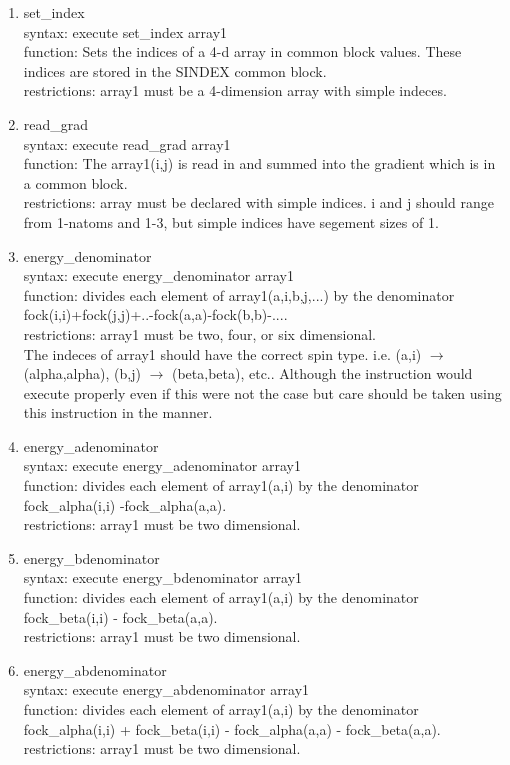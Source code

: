 \documentclass[12pt]{article}
\begin{document}
\begin{enumerate}
\item set\_index\\ 
syntax: execute set\_index array1\\ 
function: Sets the indices of a 4-d array in common block values. These indices are stored 
in the SINDEX common block.\\ 
restrictions: array1 must be a 4-dimension array with simple indeces.

\item read\_grad\\ 
syntax: execute read\_grad array1\\ 
function: The array1(i,j) is read in and summed into the gradient which is in a common block.\\ 
restrictions: array must be declared with simple indices. i and j should range from 1-natoms 
and 1-3, but simple indices have segement sizes of 1.

\item energy\_denominator\\ 
syntax: execute energy\_denominator array1\\ 
function: divides each element of array1(a,i,b,j,...) by the denominator 
fock(i,i)+fock(j,j)+..-fock(a,a)-fock(b,b)-....\\ 
restrictions: array1 must be two, four, or six dimensional.\\ 
The indeces of array1 should have the correct spin type. i.e. (a,i) $\rightarrow$ (alpha,alpha), 
(b,j) $\rightarrow$ (beta,beta), etc.. Although the instruction would execute properly even if this 
were not the case but care should be taken using this instruction in the manner.

\item energy\_adenominator\\ 
syntax: execute energy\_adenominator array1\\ 
function: divides each element of array1(a,i) by the denominator 
fock\_alpha(i,i) -fock\_alpha(a,a).\\ 
restrictions: array1 must be two dimensional.

\item energy\_bdenominator\\ 
syntax: execute energy\_bdenominator array1\\ 
function: divides each element of array1(a,i) by the denominator 
fock\_beta(i,i) - fock\_beta(a,a).\\ 
restrictions: array1 must be two dimensional.

\item energy\_abdenominator\\ 
syntax: execute energy\_abdenominator array1\\ 
function: divides each element of array1(a,i) by the denominator 
fock\_alpha(i,i) + fock\_beta(i,i) - fock\_alpha(a,a) - fock\_beta(a,a).\\ 
restrictions: array1 must be two dimensional.


\end{enumerate}
\end{document}
